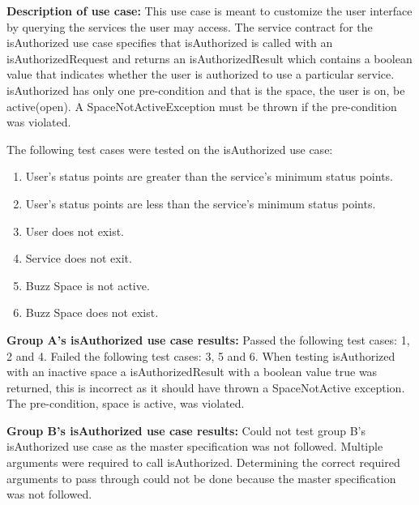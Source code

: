 \textbf{Description of use case:}\newline
This use case is meant to customize the user interface by querying the services the user may access. The service contract for the isAuthorized use case specifies that isAuthorized is called with an isAuthorizedRequest and returns an isAuthorizedResult which contains a boolean value that indicates whether the user is authorized to use a particular service. isAuthorized has only one pre-condition and that is the space, the user is on, be active(open). A SpaceNotActiveException must be thrown if the pre-condition was violated.
\medskip

\noindent
The following test cases were tested on the isAuthorized use case:
\begin{enumerate}
	\item User's status points are greater than the service's minimum status points.
	\item User's status points are less than the service's minimum status points.
	\item User does not exist.
  	\item Service does not exit.
  	\item Buzz Space is not active.
  	\item Buzz Space does not exist.
\end{enumerate}
\medskip
\noindent
\textbf{Group A's isAuthorized use case results:}\newline
Passed the following test cases: 1, 2 and 4.\newline
Failed the following test cases: 3, 5 and 6.\newline
When testing isAuthorized with an inactive space a isAuthorizedResult with a boolean value true was returned, this is incorrect as it should have thrown a SpaceNotActive exception. The pre-condition, space is active, was violated.
\medskip

\noindent
\textbf{Group B's isAuthorized use case results:}\newline
Could not test group B's isAuthorized use case as the master specification was not followed. Multiple arguments were required to call isAuthorized. Determining the correct required arguments to pass through could not be done because the master specification was not followed.